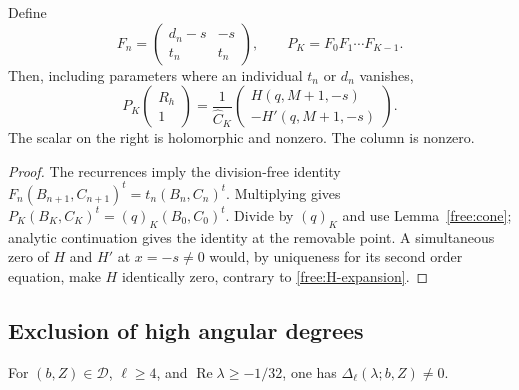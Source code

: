 \begin{lemma}\label{free:columns}
Define
\begin{equation}\label{free:backward}
 F_n=\begin{pmatrix}d_n-s&-s\\t_n&t_n\end{pmatrix},\qquad
 P_K=F_0F_1\cdots F_{K-1}.
\end{equation}
Then, including parameters where an individual $t_n$ or $d_n$ vanishes,
\begin{equation}\label{free:column-identity}
 P_K\begin{pmatrix}R_h\\1\end{pmatrix}
 =\frac1{\widehat C_K}
 \begin{pmatrix}H(q,M+1,-s)\\-H'(q,M+1,-s)\end{pmatrix}.
\end{equation}
The scalar on the right is holomorphic and nonzero.  The column is
nonzero.
\end{lemma}

\begin{proof}
The recurrences imply the division-free identity
$F_n(B_{n+1},C_{n+1})^t=t_n(B_n,C_n)^t$.  Multiplying gives
$P_K(B_K,C_K)^t=(q)_K(B_0,C_0)^t$.  Divide by $(q)_K$ and use
Lemma~\ref{free:cone}; analytic continuation gives the identity at the
removable point.  A simultaneous zero of $H$ and $H'$ at $x=-s\ne0$
would, by uniqueness for its second order equation, make $H$ identically
zero, contrary to \eqref{free:H-expansion}.
\end{proof}

\subsection{Exclusion of high angular degrees}

\begin{lemma}\label{free:high-angular}
For $(b,Z)\in\mathcal D$, $\ell\ge4$, and
$\operatorname{Re}\lambda\ge-1/32$, one has $\Delta_\ell(\lambda;b,Z)\ne0$.
\end{lemma}

